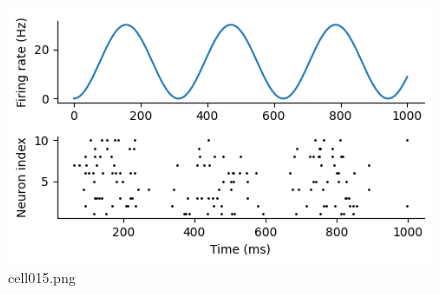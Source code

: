 \begin{figure}[ht]
	\centering
	\includegraphics[scale=0.8, max width=\linewidth]{./fig/neuron-model/isi/cell015.png}
	\caption{cell015.png}
	\label{cell015.png}
\end{figure}